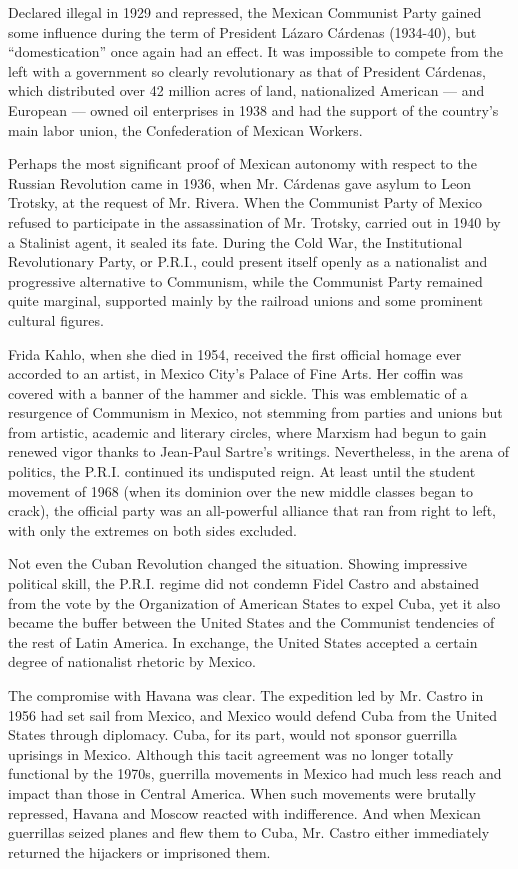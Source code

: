 Declared illegal in 1929 and repressed, the Mexican Communist Party
gained some influence during the term of President Lázaro Cárdenas
(1934-40), but ``domestication'' once again had an effect. It was
impossible to compete from the left with a government so clearly
revolutionary as that of President Cárdenas, which distributed over 42
million acres of land, nationalized American --- and European --- owned
oil enterprises in 1938 and had the support of the country's main labor
union, the Confederation of Mexican Workers.

Perhaps the most significant proof of Mexican autonomy with respect to
the Russian Revolution came in 1936, when Mr. Cárdenas gave asylum to
Leon Trotsky, at the request of Mr. Rivera. When the Communist Party of
Mexico refused to participate in the assassination of Mr. Trotsky,
carried out in 1940 by a Stalinist agent, it sealed its fate. During the
Cold War, the Institutional Revolutionary Party, or P.R.I., could
present itself openly as a nationalist and progressive alternative to
Communism, while the Communist Party remained quite marginal, supported
mainly by the railroad unions and some prominent cultural figures.

Frida Kahlo, when she died in 1954, received the first official homage
ever accorded to an artist, in Mexico City's Palace of Fine Arts. Her
coffin was covered with a banner of the hammer and sickle. This was
emblematic of a resurgence of Communism in Mexico, not stemming from
parties and unions but from artistic, academic and literary circles,
where Marxism had begun to gain renewed vigor thanks to Jean-Paul
Sartre's writings. Nevertheless, in the arena of politics, the P.R.I.
continued its undisputed reign. At least until the student movement of
1968 (when its dominion over the new middle classes began to crack), the
official party was an all-powerful alliance that ran from right to left,
with only the extremes on both sides excluded.

Not even the Cuban Revolution changed the situation. Showing impressive
political skill, the P.R.I. regime did not condemn Fidel Castro and
abstained from the vote by the Organization of American States to expel
Cuba, yet it also became the buffer between the United States and the
Communist tendencies of the rest of Latin America. In exchange, the
United States accepted a certain degree of nationalist rhetoric by
Mexico.

The compromise with Havana was clear. The expedition led by Mr. Castro
in 1956 had set sail from Mexico, and Mexico would defend Cuba from the
United States through diplomacy. Cuba, for its part, would not sponsor
guerrilla uprisings in Mexico. Although this tacit agreement was no
longer totally functional by the 1970s, guerrilla movements in Mexico
had much less reach and impact than those in Central America. When such
movements were brutally repressed, Havana and Moscow reacted with
indifference. And when Mexican guerrillas seized planes and flew them to
Cuba, Mr. Castro either immediately returned the hijackers or imprisoned
them.

